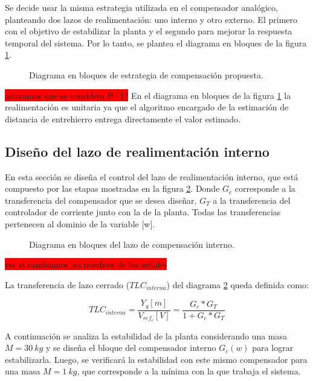 Se decide usar la misma estrategia utilizada en el compensador analógico, planteando dos lazos de realimentación: uno interno y otro externo. El primero con el objetivo de estabilizar la planta y el segundo para mejorar la respuesta temporal del sistema. Por lo tanto, se plantea el diagrama en bloques de la figura \ref{fig:diag-en-bloques-comp_digital}.

\begin{figure}[H]
	\centering
	\scalebox{0.8}{}
	\caption{Diagrama en bloques de estrategia de compensación propuesta.}	\label{fig:diag-en-bloques-comp_digital}
\end{figure}

\colorbox{red}{aclaramos que se considera H=1?}
En el diagrama en bloques de la figura \ref{fig:diag-en-bloques-comp_digital} la realimentación es unitaria ya que el algoritmo encargado de la estimación de distancia de entrehierro entrega directamente el valor estimado.

\subsection{Diseño del lazo de realimentación interno}

En esta sección se diseña el control del lazo de realimentación interno, que está compuesto por las etapas mostradas en la figura \ref{fig:diag-interno_dig}. Donde $G_c$ corresponde a la transferencia del compensador que se desea diseñar, $G_{T}$ a la transferencia del controlador de corriente junto con la de la planta. Todas las transferencias pertenecen al dominio de la variable [w].

\begin{figure}[H]
	\centering
	
	\caption{Diagrama en bloques del lazo de compensación interno.}	\label{fig:diag-interno_dig}
\end{figure}

\colorbox{red}{ver si cambiamos lso nombres de las señales}

La transferencia de lazo cerrado ($TLC_{interna}$) del diagrama \ref{fig:diag-interno_dig} queda definida como:

\begin{equation}
	TLC_{interna}=\frac{Y_g[m]}{V_{ref_c}[V]}=\frac{G_c*G_T}{1+G_c*G_T}
\end{equation}

A continuación se analiza la estabilidad de la planta considerando una masa $M=30\:kg$ y se diseña el bloque del compensador interno $G_c(w)$ para lograr estabilizarla. Luego, se verificará la estabilidad con este mismo compensador para una masa $M=1\:kg$, que corresponde a la mínima con la que trabaja el sistema.

